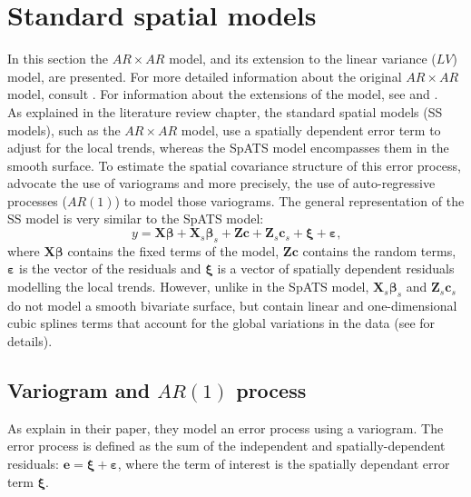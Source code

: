 \section{Standard spatial models}
\label{sec:arxar_model}
In this section the $AR \times AR$ model, and its extension to the linear variance ($LV$) model, are presented. For more detailed information about the original $AR \times AR$ model, consult \textcite{gilmour_accounting_1997}. For information about the extensions of the model, see \textcite{piepho_linear_2010} and \textcite{williams_neighbour_1986}.\\

As explained in the literature review chapter, the standard spatial models (SS models), such as the $AR \times AR$ model, use a spatially dependent error term to adjust for the local trends, whereas the SpATS model encompasses them in the smooth surface. 
To estimate the spatial covariance structure of this error process, \textcite{gilmour_accounting_1997} advocate the use of variograms and more precisely, the use of auto-regressive processes ($AR(1)$) to model those variograms. 
The general representation of the SS model is very similar to the SpATS model:
\begin{equation}
	y = \mathbf{X}\boldsymbol{\beta} + \mathbf{X}_{s}\boldsymbol{\beta}_{s} + \mathbf{Zc} +  \mathbf{Z}_{s}\mathbf{c}_{s} + 
	\boldsymbol{\xi} + \boldsymbol{\varepsilon}
	\text{,}
	\label{eq:standard_spatial_model}
\end{equation}
where $\mathbf{X}\boldsymbol{\beta}$ contains the fixed terms of the model, $\mathbf{Zc}$ contains the random terms, $\boldsymbol{\varepsilon}$ is the vector of the residuals and $\boldsymbol{\xi}$ is a vector of spatially dependent residuals modelling the local trends. However, unlike in the SpATS model, $\mathbf{X}_{s}\boldsymbol{\beta}_{s}$ and $\mathbf{Z}_{s}\mathbf{c}_{s}$ do not model a smooth bivariate surface, but contain linear and one-dimensional cubic splines terms that account for the global variations in the data (see \textcite{verbyla_analysis_1999} for details).\\

\subsection{Variogram and $AR(1)$ process}
As \textcite{gilmour_accounting_1997} explain in their paper, they model an error process using a variogram. The error process is defined as the sum of the independent and spatially-dependent residuals: $\mathbf{e} = \boldsymbol{\xi} + \boldsymbol{\varepsilon}$, where the term of interest is the spatially dependant error term $\boldsymbol{\xi}$.\\

